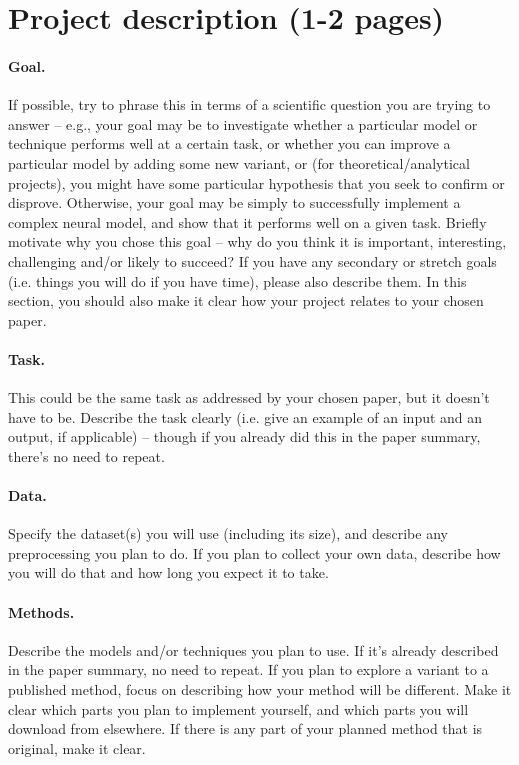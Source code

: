 \documentclass{article}
\begin{document}
\section{Project description (1-2 pages)}

\paragraph{Goal.} 
If possible, try to phrase this in terms of a scientific question you are trying to answer -- e.g., your goal may be to investigate whether a particular model or technique performs well at a certain task, or whether you can improve a particular model by adding some new variant, or (for theoretical/analytical projects), you might have some particular hypothesis that you seek to confirm or disprove.
Otherwise, your goal may be simply to successfully implement a complex neural model, and show that it performs well on a given task.
Briefly motivate why you chose this goal -- why do you think it is important, interesting, challenging and/or likely to succeed?
If you have any secondary or stretch goals (i.e. things you will do if you have time), please also describe them.
In this section, you should also make it clear how your project relates to your chosen paper.

\paragraph{Task.} 
This could be the same task as addressed by your chosen paper, but it doesn't have to be. Describe the task clearly (i.e. give an example of an input and an output, if applicable) -- though if you already did this in the paper summary, there's no need to repeat. 

\paragraph{Data.}
Specify the dataset(s) you will use (including its size), and describe any preprocessing you plan to do. If you plan to collect your own data, describe how you will do that and how long you expect it to take.

\paragraph{Methods.}
Describe the models and/or techniques you plan to use.
If it's already described in the paper summary, no need to repeat.
If you plan to explore a variant to a published method, focus on describing how your method will be different.
Make it clear which parts you plan to implement yourself, and which parts you will download from elsewhere. 
If there is any part of your planned method that is original, make it clear.
\end{document}
